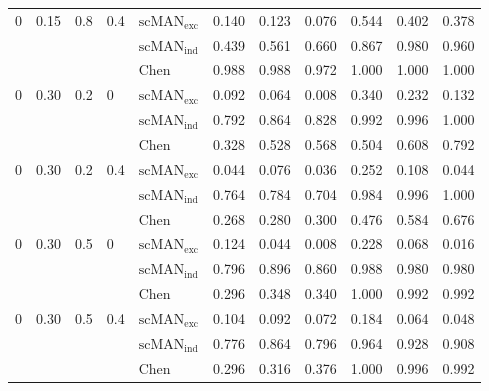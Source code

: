 \begin{table}[H]
\begin{tabular}{lllllllllll}
0 & 0.15 & 0.8 & 0.4 & $\mathrm{scMAN}_{\mathrm{exc}}$ & 0.140 & 0.123 & 0.076 & 0.544 & 0.402 & 0.378 \\
 &  &  &  & $\mathrm{scMAN}_{\mathrm{ind}}$ & 0.439 & 0.561 & 0.660 & 0.867 & 0.980 & 0.960 \\
 &  &  &  & Chen & 0.988 & 0.988 & 0.972 & 1.000 & 1.000 & 1.000 \\
0 & 0.30 & 0.2 & 0 & $\mathrm{scMAN}_{\mathrm{exc}}$ & 0.092 & 0.064 & 0.008 & 0.340 & 0.232 & 0.132 \\
 &  &  &  & $\mathrm{scMAN}_{\mathrm{ind}}$ & 0.792 & 0.864 & 0.828 & 0.992 & 0.996 & 1.000 \\
 &  &  &  & Chen & 0.328 & 0.528 & 0.568 & 0.504 & 0.608 & 0.792 \\
0 & 0.30 & 0.2 & 0.4 & $\mathrm{scMAN}_{\mathrm{exc}}$ & 0.044 & 0.076 & 0.036 & 0.252 & 0.108 & 0.044 \\
 &  &  &  & $\mathrm{scMAN}_{\mathrm{ind}}$ & 0.764 & 0.784 & 0.704 & 0.984 & 0.996 & 1.000 \\
 &  &  &  & Chen & 0.268 & 0.280 & 0.300 & 0.476 & 0.584 & 0.676 \\
0 & 0.30 & 0.5 & 0 & $\mathrm{scMAN}_{\mathrm{exc}}$ & 0.124 & 0.044 & 0.008 & 0.228 & 0.068 & 0.016 \\
 &  &  &  & $\mathrm{scMAN}_{\mathrm{ind}}$ & 0.796 & 0.896 & 0.860 & 0.988 & 0.980 & 0.980 \\
 &  &  &  & Chen & 0.296 & 0.348 & 0.340 & 1.000 & 0.992 & 0.992 \\
0 & 0.30 & 0.5 & 0.4 & $\mathrm{scMAN}_{\mathrm{exc}}$ & 0.104 & 0.092 & 0.072 & 0.184 & 0.064 & 0.048 \\
 &  &  &  & $\mathrm{scMAN}_{\mathrm{ind}}$ & 0.776 & 0.864 & 0.796 & 0.964 & 0.928 & 0.908 \\
 &  &  &  & Chen & 0.296 & 0.316 & 0.376 & 1.000 & 0.996 & 0.992 \\
\hline
\end{tabular}
\end{table}

